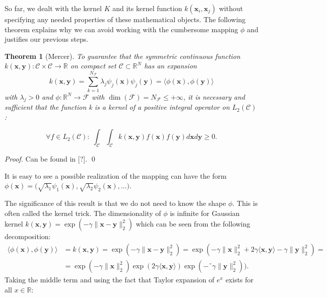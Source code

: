 \documentclass[11pt,american]{book} %
\theoremstyle{plain}
\newtheorem{thm}{Theorem}
\theoremstyle{definition}
\begin{document}
So far, we dealt with the kernel $K$ and its kernel function $k(\bm{x}_i, \bm{x}_j)$ without specifying any needed properties of these mathematical objects. The following theorem explains why we can avoid working with the cumbersome mapping $\phi$ and justifies our previous steps.

\begin{thm}[Mercer]
	To guarantee that the symmetric continuous function $k(\bm{x}, \bm{y}): \mathcal{C} \times \mathcal{C} \rightarrow \mathbb{R}$ on compact set $\mathcal{C} \subset \mathbb{R}^N$ has an expansion
	\begin{equation}
		k(\bm{x}, \bm{y}) = \sum_{k=1}^{N_{\mathcal{F}}} \lambda_j \psi_j(\bm{x}) \psi_j(\bm{y}) = \langle \phi(\bm{x}), \phi(\bm{y}) \rangle
	\end{equation}
	with $\lambda_j >0$ and $\phi: \mathbb{R}^N \rightarrow \mathcal{F}$ with $\dim(\mathcal{F}) = N_{\mathcal{F}} \leq + \infty$, it is necessary and sufficient that  the function k is a kernel of a positive integral operator on $L_2 (\mathcal{C})$:
	
	\begin{equation}
		\forall f \in L_2 (\mathcal{C}): \; \int_{\mathcal{C}} \int_{\mathcal{C}} k(\bm{x}, \bm{y}) f(\bm{x}) f(\bm{y}) d\bm{x} d\bm{y} \geq 0.
	\end{equation}
\end{thm}

\emph{Proof.} Can be found in [?]. \qed


It is easy to see a possible realization of the mapping can have the form $\phi(\bm{x}) = \Big(\sqrt{\lambda_1}\psi_1(\bm{x}), \sqrt{\lambda_2}\psi_2(\bm{x}), \dots \Big)$.

The significance of this result is that we do not need to know the shape $\phi$. This is often called the kernel trick. The dimensionality of $\phi$ is infinite for Gaussian kernel $k(\bm{x}, \bm{y}) = \exp(- \gamma\| \bm{x} - \bm{y} \|^2_2)$ which can be seen from the following decomposition:
\begin{equation}
	\begin{aligned}
		\langle \phi(\bm{x}), \phi(\bm{y}) \rangle &= k(\bm{x}, \bm{y}) = \exp(- \gamma\| \bm{x} - \bm{y} \|^2_2)=\exp(-\gamma \|\bm{x} \|^2_2 + 2\gamma \langle \bm{x}, \bm{y} \rangle - \gamma \|\bm{y} \|^2_2) = \\ &= \exp(-\gamma \|\bm{x} \|^2_2)\exp(2\gamma \langle \bm{x}, \bm{y} \rangle )\exp(-ˇ\gamma \|\bm{y} \|^2_2) ).
	\end{aligned}
\end{equation}
Taking the middle term and using the fact that Taylor expansion of $e^x$ exists for all $x \in \mathbb{R}$:
\end{document}
